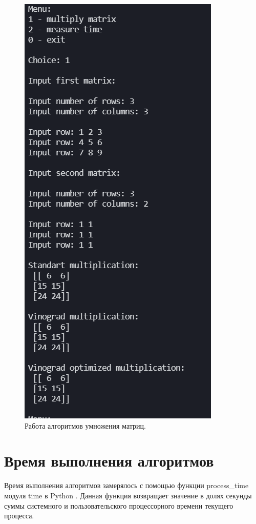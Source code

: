 \documentclass[12pt]{report}
\begin{document}
\begin{figure}[h]
	\begin{center}
	\includegraphics[scale=0.9]{example.png}
	 \caption{Работа алгоритмов умножения матриц.}
	\end{center}
\end{figure}

\section{Время выполнения алгоритмов}
Время выполнения алгоритмов замерялось с помощью функции process\_time модуля time в Python  \cite{process}. Данная функция возвращает значение в долях секунды суммы системного и пользовательского процессорного времени текущего процесса. \newline
\end{document}
